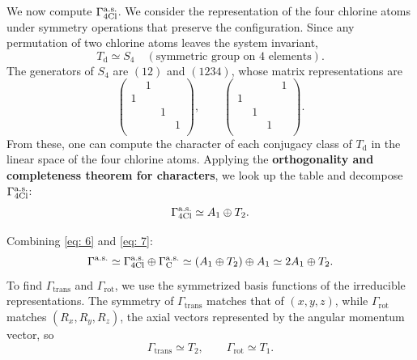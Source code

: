 \documentclass[lang=en, column=onecolumn, mathfont=times]{spArticle}
\begin{document}
We now compute $\Gamma ^{\mathrm{a}.\mathrm{s}.}_{4\ce{Cl}}$. We consider the representation of the four chlorine atoms under symmetry operations that preserve the configuration. Since any permutation of two chlorine atoms leaves the system invariant,
$$
T_{\mathrm{d}}\simeq S_4\quad \left( \text{symmetric group on 4 elements} \right).
$$
The generators of $S_4$ are $(12)$ and $(1234)$, whose matrix representations are
$$
    \left( \begin{matrix}
    &		1&		&		\\
    1&		&		&		\\
    &		&		1&		\\
    &		&		&		1\\
\end{matrix} \right) , \qquad \left( \begin{matrix}
    &		&		&		1\\
    1&		&		&		\\
    &		1&		&		\\
    &		&		1&		\\
\end{matrix} \right).
$$
From these, one can compute the character of each conjugacy class of $T_\mathrm{d}$ in the linear space of the four chlorine atoms. Applying the \textbf{orthogonality and completeness theorem for characters}, we look up the table and decompose $\Gamma ^{\mathrm{a.s.}}_{4\ce{Cl}}$:
\begin{equation}
    \Gamma ^{\mathrm{a}.\mathrm{s}.}_{4\ce{Cl}}\simeq A_1\oplus T_2.
    \label{eq: 7}
\end{equation}

Combining \eqref{eq: 6} and \eqref{eq: 7}:
\begin{equation*}
    \Gamma ^{\mathrm{a}.\mathrm{s}.}\simeq
    \Gamma ^{\mathrm{a}.\mathrm{s}.}_{4\ce{Cl}}\oplus \Gamma ^{\mathrm{a}.\mathrm{s}.}_{\ce{C}}\simeq \left( A_1\oplus T_2 \right) \oplus A_1\simeq 2A_1\oplus T_2.
\end{equation*}
To find $\Gamma _{\mathrm{trans}}$ and $\Gamma _{\mathrm{rot}}$, we use the symmetrized basis functions of the irreducible representations. The symmetry of $\Gamma _{\mathrm{trans}}$ matches that of $\left(x, y, z\right)$, while $\Gamma _{\mathrm{rot}}$ matches $\left( R_x, R_y, R_z \right)$, the axial vectors represented by the angular momentum vector, so
\begin{equation}
    {\Gamma _{\mathrm{trans}}\simeq T_2}, \qquad {\Gamma _{\mathrm{rot}}\simeq T_1}.
    \label{eq: 8}
\end{equation}
\end{document}
